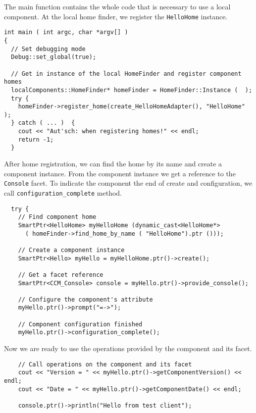 \noindent
The main function contains the whole code that is necessary to use a 
local component.
At the local home finder, we register the {\tt HelloHome} instance.
\begin{small}
\begin{verbatim}
int main ( int argc, char *argv[] )
{
  // Set debugging mode
  Debug::set_global(true);

  // Get in instance of the local HomeFinder and register component homes
  localComponents::HomeFinder* homeFinder = HomeFinder::Instance (  );
  try {                       
    homeFinder->register_home(create_HelloHomeAdapter(), "HelloHome" );
  } catch ( ... )  {
    cout << "Aut'sch: when registering homes!" << endl;
    return -1;
  }
\end{verbatim}
\end{small}

\noindent
After home registration, we can find the home by its name and create a
component instance. From the component instance we get a reference
to the {\tt Console} facet.
To indicate the component the end of create and configuration, we call 
{\tt configuration\_complete} method.
\begin{small}
\begin{verbatim}
  try {
    // Find component home
    SmartPtr<HelloHome> myHelloHome (dynamic_cast<HelloHome*>
      ( homeFinder->find_home_by_name ( "HelloHome").ptr ()));

    // Create a component instance
    SmartPtr<Hello> myHello = myHelloHome.ptr()->create();
  
    // Get a facet reference
    SmartPtr<CCM_Console> console = myHello.ptr()->provide_console();

    // Configure the component's attribute
    myHello.ptr()->prompt("=->");

    // Component configuration finished
    myHello.ptr()->configuration_complete();
\end{verbatim}
\end{small}

\noindent
Now we are ready to use the operations provided by the component and its
facet.
\begin{small}
\begin{verbatim}    
    // Call operations on the component and its facet
    cout << "Version = " << myHello.ptr()->getComponentVersion() << endl;
    cout << "Date = " << myHello.ptr()->getComponentDate() << endl;
	
    console.ptr()->println("Hello from test client");
\end{verbatim}
\end{small}

